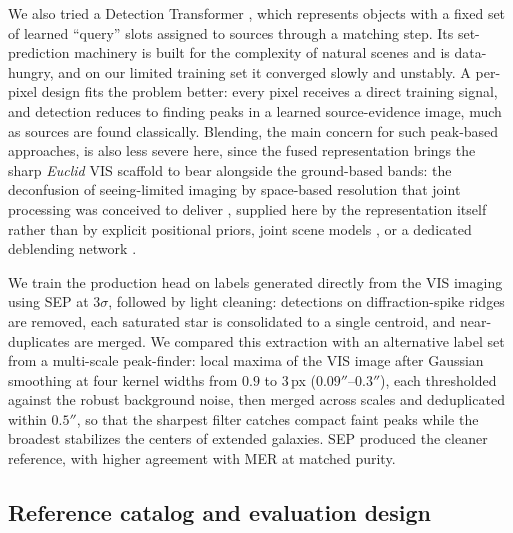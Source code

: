 \documentclass[twocolumn,linenumbers]{aastex701}
\begin{document}
We also tried a Detection Transformer \citep[DETR;][]{DETR}, which represents objects with a fixed set of learned ``query'' slots assigned to sources through a matching step. Its set-prediction machinery is built for the complexity of natural scenes and is data-hungry, and on our limited training set it converged slowly and unstably. A per-pixel design fits the problem better: every pixel receives a direct training signal, and detection reduces to finding peaks in a learned source-evidence image, much as sources are found classically. Blending, the main concern for such peak-based approaches, is also less severe here, since the fused representation brings the sharp \textit{Euclid} VIS scaffold to bear alongside the ground-based bands: the deconfusion of seeing-limited imaging by space-based resolution that joint processing was conceived to deliver \citep{Chary2020}, supplied here by the representation itself rather than by explicit positional priors, joint scene models \citep[e.g., \textsc{Scarlet};][]{Melchior2018}, or a dedicated deblending network \citep{Hemmati2022}.

We train the production head on labels generated directly from the VIS imaging using \textsc{SEP} \citep{Bertin1996,SEP} at $3\sigma$, followed by light cleaning: detections on diffraction-spike ridges are removed, each saturated star is consolidated to a single centroid, and near-duplicates are merged. We compared this extraction with an alternative label set from a multi-scale peak-finder: local maxima of the VIS image after Gaussian smoothing at four kernel widths from $0.9$ to $3$\,px ($0.09''$--$0.3''$), each thresholded against the robust background noise, then merged across scales and deduplicated within $0.5''$, so that the sharpest filter catches compact faint peaks while the broadest stabilizes the centers of extended galaxies. \textsc{SEP} produced the cleaner reference, with higher agreement with MER at matched purity.

\subsection{Reference catalog and evaluation design}
\end{document}
